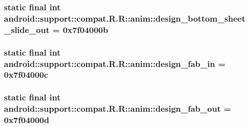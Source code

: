 \hypertarget{classandroid_1_1support_1_1compat_1_1_r_1_1anim_42e9278f6fc29f81a4af50407f34027c}{
\subsubsection[{design\_\-bottom\_\-sheet\_\-slide\_\-out}]{\setlength{\rightskip}{0pt plus 5cm}static final int android::support::compat.R.R::anim::design\_\-bottom\_\-sheet\_\-slide\_\-out = 0x7f04000b}}
\label{classandroid_1_1support_1_1compat_1_1_r_1_1anim_42e9278f6fc29f81a4af50407f34027c}


\hypertarget{classandroid_1_1support_1_1compat_1_1_r_1_1anim_a652ae56074979c3201b1037d897ebb0}{
\subsubsection[{design\_\-fab\_\-in}]{\setlength{\rightskip}{0pt plus 5cm}static final int android::support::compat.R.R::anim::design\_\-fab\_\-in = 0x7f04000c}}
\label{classandroid_1_1support_1_1compat_1_1_r_1_1anim_a652ae56074979c3201b1037d897ebb0}


\hypertarget{classandroid_1_1support_1_1compat_1_1_r_1_1anim_c5237a2ff0680027cee2289ca23d5afd}{
\subsubsection[{design\_\-fab\_\-out}]{\setlength{\rightskip}{0pt plus 5cm}static final int android::support::compat.R.R::anim::design\_\-fab\_\-out = 0x7f04000d}}
\label{classandroid_1_1support_1_1compat_1_1_r_1_1anim_c5237a2ff0680027cee2289ca23d5afd}


